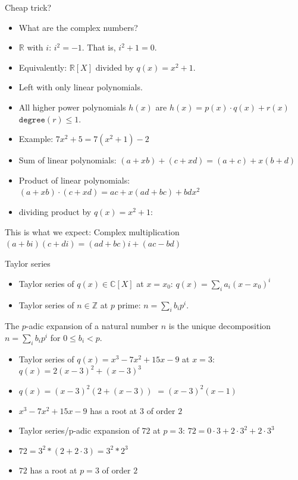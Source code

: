 \documentclass[8pt]{beamer}
\newcommand{\Z}{\mathbb Z}
\newcommand{\C}{\mathbb C}
\newcommand{\degree}{\texttt{degree}}
\begin{document}
\begin{frame}[fragile]{Cheap trick?}

\begin{itemize}
\item What are the complex numbers? \pause
\item $\mathbb R$ with $i$: $i^2 = -1$. \pause That is, $i^2 + 1 = 0$. \pause
\item Equivalently: $\mathbb R[X]$ \pause divided by $q(x) = x^2 + 1$. \pause
\item Left with only linear polynomials. \pause
\item All higher power polynomials $h(x)$  are $h(x) = p(x) \cdot q(x) + r(x)$ \pause $\degree(r) \leq 1$. \pause
\item Example: $7x^2 + 5 = 7(x^2 + 1) - 2$ \pause
\item Sum of linear polynomials: $(a + xb) + (c + xd) = (a + c) + x(b + d) $\pause
\item Product of linear polynomials: $(a + xb) \cdot (c + xd) = ac + x(ad + bc) + bdx^2$ \pause
\item dividing product by $q(x) = x^2 + 1$:
\end{itemize}

 \pause

\begin{block}{This is what we expect: Complex multiplication}
$(a + bi) (c + di) = (ad + bc) i + (ac - bd)$
\end{block}
\end{frame}

\begin{frame}{Taylor series}

\begin{itemize}
\item Taylor series of $q(x) \in \C[X]$ at $x = x_0$: $q(x) = \sum_i a_i (x - x_0)^i$ \pause
\item Taylor series of $n \in \Z$ at $p$ prime: $n = \sum_i b_i p^i$. \pause
\end{itemize}
\begin{definition}
The $p$-adic expansion of a natural number $n$ is
the unique decomposition $n = \sum_i b_i p^i$ for $0 \leq b_i < p$.
\end{definition}

\begin{itemize}
\item Taylor series of $q(x) = x^3 - 7x^2 + 15x - 9$  \pause at $x = 3$: \pause $q(x) =  2(x - 3)^2 + (x - 3)^3$ \pause
\item $q(x) = (x-3)^2(2 + (x-3))$ \pause $ = (x-3)^2(x-1)$ \pause
\item $x^3 - 7x^2 + 15x - 9$ has a root at $3$ of order $2$ \pause

\item Taylor series/p-adic expansion of $72$ at $p = 3$: \pause $72 = 0 \cdot 3 + 2 \cdot 3^2 + 2 \cdot 3^3$ \pause
\item $72 = 3^2 * (2 + 2 \cdot 3) = 3^2 * 2^3$ \pause
\item $72$ has a root at $p=3$ of order $2$ \pause
\end{itemize}
\end{frame}
\end{document}
